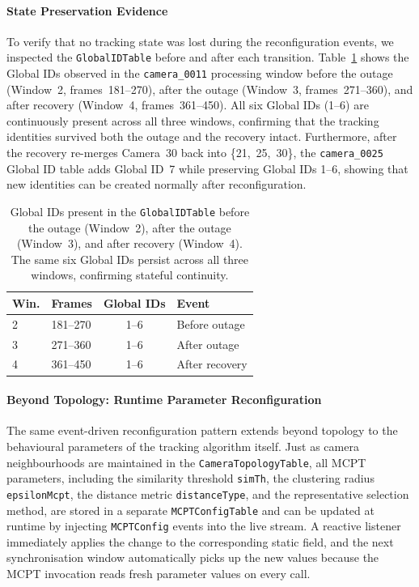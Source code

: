 \documentclass[5p,times]{elsarticle}
\begin{document}
\paragraph{State Preservation Evidence}
To verify that no tracking state was lost during the reconfiguration events, we inspected the \texttt{GlobalIDTable} before and after each transition. Table~\ref{tab:global_id_evidence} shows the Global IDs observed in the \texttt{camera\_0011} processing window before the outage (Window~2, frames~181--270), after the outage (Window~3, frames~271--360), and after recovery (Window~4, frames~361--450). All six Global IDs (1--6) are continuously present across all three windows, confirming that the tracking identities survived both the outage and the recovery intact. Furthermore, after the recovery re-merges Camera~30 back into \mbox{\{21, 25, 30\}}, the \texttt{camera\_0025} Global ID table adds Global ID~7 while preserving Global IDs 1--6, showing that new identities can be created normally after reconfiguration.



\begin{table}[tbh!]
    \centering
    \small
    \setlength{\tabcolsep}{4pt}
    \caption{Global IDs present in the \texttt{GlobalIDTable} before the outage (Window~2),
    after the outage (Window~3), and after recovery (Window~4). The same six Global IDs
    persist across all three windows, confirming stateful continuity.}
    \label{tab:global_id_evidence}
    \begin{tabular}{@{}llcl@{}}
        \toprule
        \textbf{Win.} & \textbf{Frames} & \textbf{Global IDs} & \textbf{Event} \\ \midrule
        2 & 181--270 & 1--6 & Before outage \\
        3 & 271--360 & 1--6 & After outage \\
        4 & 361--450 & 1--6 & After recovery \\ \bottomrule
    \end{tabular}
\end{table}


\paragraph{Beyond Topology: Runtime Parameter Reconfiguration}
The same event-driven reconfiguration pattern extends beyond topology to the behavioural parameters of the tracking algorithm itself. Just as camera neighbourhoods are maintained in the \texttt{CameraTopologyTable}, all MCPT parameters, including the similarity threshold \texttt{simTh}, the clustering radius \texttt{epsilonMcpt}, the distance metric \texttt{distanceType}, and the representative selection method, are stored in a separate \texttt{MCPTConfigTable} and can be updated at runtime by injecting \texttt{MCPTConfig} events into the live stream. A reactive listener immediately applies the change to the corresponding static field, and the next synchronisation window automatically picks up the new values because the MCPT invocation reads fresh parameter values on every call.
\end{document}
